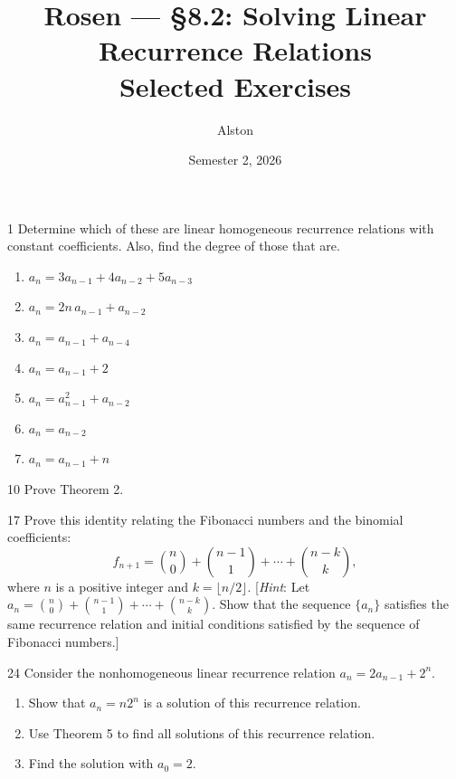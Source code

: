 \documentclass[11pt]{article}
\title{Rosen --- \S 8.2: Solving Linear Recurrence Relations\\ \large Selected Exercises}
\author{Alston}
\date{Semester 2, 2026}
\begin{document}
\maketitle

\begin{exercise}{1}
    Determine which of these are linear homogeneous recurrence
    relations with constant coefficients. Also, find the degree of
    those that are.
    \begin{enumerate}[label=(\alph*)]
        \item $a_n = 3a_{n-1} + 4a_{n-2} + 5a_{n-3}$
        \item $a_n = 2n\,a_{n-1} + a_{n-2}$
        \item $a_n = a_{n-1} + a_{n-4}$
        \item $a_n = a_{n-1} + 2$
        \item $a_n = a_{n-1}^2 + a_{n-2}$
        \item $a_n = a_{n-2}$
        \item $a_n = a_{n-1} + n$
    \end{enumerate}
\end{exercise}

\begin{exercise}{10}
    Prove Theorem 2.
\end{exercise}

\begin{exercise}{17}
    Prove this identity relating the Fibonacci numbers and the
    binomial coefficients:
    \[
    f_{n+1} = \binom{n}{0} + \binom{n-1}{1} + \cdots + \binom{n-k}{k},
    \]
    where $n$ is a positive integer and $k = \lfloor n/2 \rfloor$.
    [\emph{Hint}: Let
    $a_n = \binom{n}{0} + \binom{n-1}{1} + \cdots + \binom{n-k}{k}$.
    Show that the sequence $\{a_n\}$ satisfies the same recurrence
    relation and initial conditions satisfied by the sequence of
    Fibonacci numbers.]
\end{exercise}

\begin{exercise}{24}
    Consider the nonhomogeneous linear recurrence relation
    $a_n = 2a_{n-1} + 2^n$.
    \begin{enumerate}[label=(\alph*)]
        \item Show that $a_n = n2^n$ is a solution of this recurrence
        relation.
        \item Use Theorem 5 to find all solutions of this recurrence
        relation.
        \item Find the solution with $a_0 = 2$.
    \end{enumerate}
\end{exercise}
\end{document}
